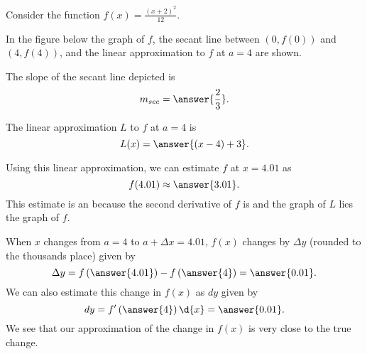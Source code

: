 \documentclass{ximera}
\author{Nela Lakos \and Kyle Parsons}
\begin{document}
\begin{exercise}

Consider the function $f(x) = \frac{(x+2)^2}{12}$.

In the figure below the graph of $f$, the secant line between $(0,f(0))$ and $(4,f(4))$, and the linear approximation to $f$ at $a=4$ are shown.

\begin{image}
\end{image}

The slope of the secant line depicted is
\[
m_{sec} = \answer{\frac{2}{3}}.
\]

The linear approximation $L$ to $f$ at $a=4$ is
\[
L(x) = \answer{(x-4) + 3}.
\]

Using this linear approximation, we can estimate $f$ at $x=4.01$ as
\[
f(4.01) \approx \answer{3.01}.
\]
This estimate is an  because the second derivative of $f$ is  and the graph of $L$ lies  the graph of $f$.

When $x$ changes from $a=4$ to $a+\Delta x=4.01$, $f(x)$ changes by $\Delta y$ (rounded to the thousands place) given by
\[
\Delta y = f\left(\answer{4.01}\right) - f\left(\answer{4}\right) = \answer{0.01}.
\]
We can also estimate this change in $f(x)$ as $dy$ given by
\[
dy = f'\left(\answer{4}\right)\d{x} = \answer{0.01}.
\]
We see that our approximation of the change in $f(x)$ is very close to the true change.

\end{exercise}
\end{document}
